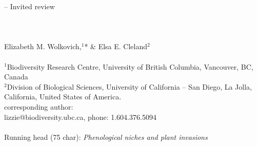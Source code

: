 \documentclass[11pt,a4paper,oneside]{article}
\begin{document}
\linenumbers
{} -- Invited review\\
\\
\\
\\
\noindent Elizabeth M. Wolkovich,$^{1}$* \& Elsa E. Cleland$^{2}$ \\
\\
\noindent $^{1}$Biodiversity Research Centre, University of British Columbia, Vancouver, BC, Canada\\

\noindent  $^{2}$Division of Biological Sciences, University of California -- San Diego, La Jolla, California, United States of America.\\

\noindent *corresponding author: \\
\noindent lizzie@biodiversity.ubc.ca, phone: 1.604.376.5094\\
\\
\noindent Running head (75 char): \emph{Phenological niches and plant invasions}
\end{document}
